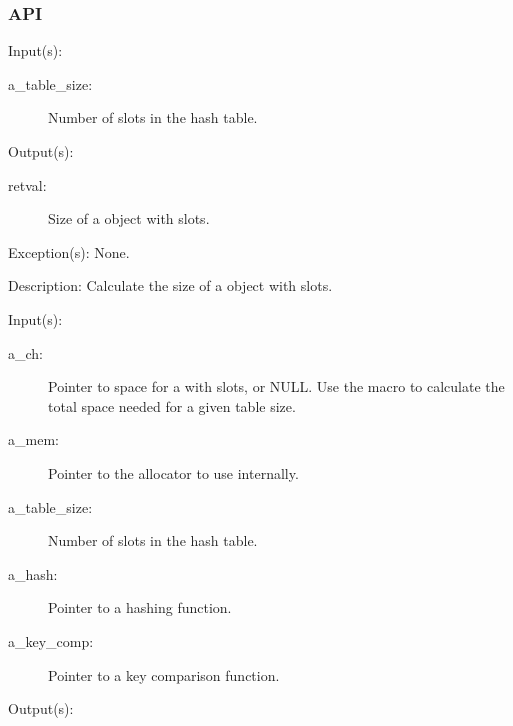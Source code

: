 \subsubsection{API}
\begin{capi}
\label{_CW_CH_TABLE2SIZEOF}
	\begin{capilist}
	\item[Input(s): ]
		\begin{description}\item[]
		\item[a\_table\_size: ]
			Number of slots in the hash table.
		\end{description}
	\item[Output(s): ]
		\begin{description}\item[]
		\item[retval: ]
			Size of a  object with
			 slots.
		\end{description}
	\item[Exception(s): ] None.
	\item[Description: ]
		Calculate the size of a  object with
		 slots.
	\end{capilist}
\label{ch_new}
	\begin{capilist}
	\item[Input(s): ]
		\begin{description}\item[]
		\item[a\_ch: ]
			Pointer to space for a \classname{ch} with
			 slots, or NULL.  Use the
			 macro to calculate
			the total space needed for a given table size.
		\item[a\_mem: ]
			Pointer to the allocator to use internally.
		\item[a\_table\_size: ]
			Number of slots in the hash table.
		\item[a\_hash: ]
			Pointer to a hashing function.
		\item[a\_key\_comp: ]
			Pointer to a key comparison function.
		\end{description}
	\item[Output(s): ]

\end{capilist}
\end{capi}
